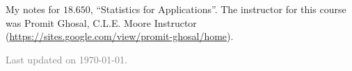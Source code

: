 \documentclass[11pt]{article}
\begin{document}
\maketitle



My notes for $18.650$, ``Statistics for Applications''. The instructor for this course was Promit Ghosal, C.L.E. Moore Instructor (\url{https://sites.google.com/view/promit-ghosal/home}). 

\vfill

\hfill \textcolor{gray}{\small Last updated on \today.}
\newpage
\tableofcontents 
\newpage
\importfiles %
\end{document}
